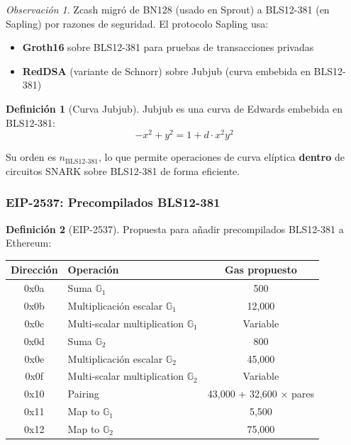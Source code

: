 \documentclass[11pt,a4paper,twoside,openright]{book}
\theoremstyle{definition}
\newtheorem{definition}{Definición}[chapter]
\theoremstyle{plain}
\theoremstyle{remark}
\newtheorem{remark}{Observación}[chapter]
\newcommand{\G}{\mathbb{G}}
\begin{document}
\begin{remark}
Zcash migró de BN128 (usado en Sprout) a BLS12-381 (en Sapling) por razones de seguridad. El protocolo Sapling usa:
\begin{itemize}
    \item \textbf{Groth16} sobre BLS12-381 para pruebas de transacciones privadas
    \item \textbf{RedDSA} (variante de Schnorr) sobre Jubjub (curva embebida en BLS12-381)
\end{itemize}
\end{remark}

\begin{definition}[Curva Jubjub]
Jubjub es una curva de Edwards embebida en BLS12-381:
\[ -x^2 + y^2 = 1 + d \cdot x^2 y^2 \]

Su orden es $n_{\text{BLS12-381}}$, lo que permite operaciones de curva elíptica \textbf{dentro} de circuitos SNARK sobre BLS12-381 de forma eficiente.
\end{definition}

\subsubsection{EIP-2537: Precompilados BLS12-381}

\begin{definition}[EIP-2537]
Propuesta para añadir precompilados BLS12-381 a Ethereum:

\begin{center}
\begin{tabular}{clc}
\toprule
\textbf{Dirección} & \textbf{Operación} & \textbf{Gas propuesto} \\
\midrule
0x0a & Suma $\G_1$ & 500 \\
0x0b & Multiplicación escalar $\G_1$ & 12,000 \\
0x0c & Multi-scalar multiplication $\G_1$ & Variable \\
0x0d & Suma $\G_2$ & 800 \\
0x0e & Multiplicación escalar $\G_2$ & 45,000 \\
0x0f & Multi-scalar multiplication $\G_2$ & Variable \\
0x10 & Pairing & 43,000 + 32,600 × pares \\
0x11 & Map to $\G_1$ & 5,500 \\
0x12 & Map to $\G_2$ & 75,000 \\
\bottomrule
\end{tabular}
\end{center}
\end{definition}
\end{document}

